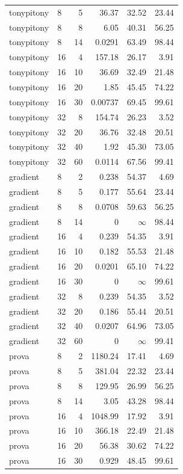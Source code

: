 \documentclass[11pt,a4paper]{article}
\begin{document}
\begin{longtable}{llrrrr}
tonypitony & 8 & 5 & 36.37 & 32.52 & 23.44 \\
tonypitony & 8 & 8 & 6.05 & 40.31 & 56.25 \\
tonypitony & 8 & 14 & 0.0291 & 63.49 & 98.44 \\
tonypitony & 16 & 4 & 157.18 & 26.17 & 3.91 \\
tonypitony & 16 & 10 & 36.69 & 32.49 & 21.48 \\
tonypitony & 16 & 20 & 1.85 & 45.45 & 74.22 \\
tonypitony & 16 & 30 & 0.00737 & 69.45 & 99.61 \\
tonypitony & 32 & 8 & 154.74 & 26.23 & 3.52 \\
tonypitony & 32 & 20 & 36.76 & 32.48 & 20.51 \\
tonypitony & 32 & 40 & 1.92 & 45.30 & 73.05 \\
tonypitony & 32 & 60 & 0.0114 & 67.56 & 99.41 \\
gradient & 8 & 2 & 0.238 & 54.37 & 4.69 \\
gradient & 8 & 5 & 0.177 & 55.64 & 23.44 \\
gradient & 8 & 8 & 0.0708 & 59.63 & 56.25 \\
gradient & 8 & 14 & 0 & $\infty$ & 98.44 \\
gradient & 16 & 4 & 0.239 & 54.35 & 3.91 \\
gradient & 16 & 10 & 0.182 & 55.53 & 21.48 \\
gradient & 16 & 20 & 0.0201 & 65.10 & 74.22 \\
gradient & 16 & 30 & 0 & $\infty$ & 99.61 \\
gradient & 32 & 8 & 0.239 & 54.35 & 3.52 \\
gradient & 32 & 20 & 0.186 & 55.44 & 20.51 \\
gradient & 32 & 40 & 0.0207 & 64.96 & 73.05 \\
gradient & 32 & 60 & 0 & $\infty$ & 99.41 \\
prova & 8 & 2 & 1180.24 & 17.41 & 4.69 \\
prova & 8 & 5 & 381.04 & 22.32 & 23.44 \\
prova & 8 & 8 & 129.95 & 26.99 & 56.25 \\
prova & 8 & 14 & 3.05 & 43.28 & 98.44 \\
prova & 16 & 4 & 1048.99 & 17.92 & 3.91 \\
prova & 16 & 10 & 366.18 & 22.49 & 21.48 \\
prova & 16 & 20 & 56.38 & 30.62 & 74.22 \\
prova & 16 & 30 & 0.929 & 48.45 & 99.61 \\

\end{longtable}
\end{document}
